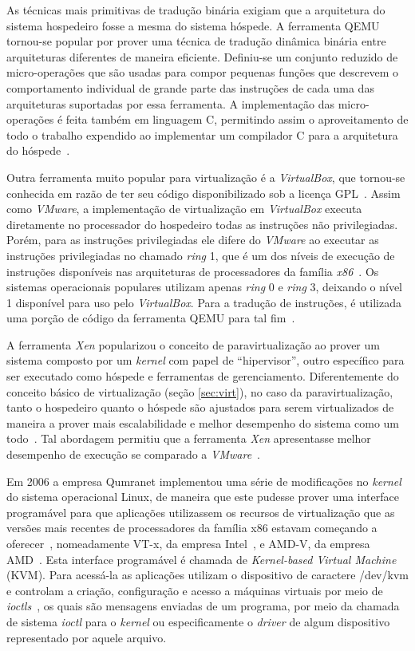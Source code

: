 As técnicas mais primitivas de tradução binária exigiam que a arquitetura
do sistema hospedeiro fosse a mesma do sistema hóspede. A ferramenta
QEMU tornou-se popular por prover uma técnica de
tradução dinâmica binária entre arquiteturas diferentes de maneira
eficiente. Definiu-se um conjunto reduzido de micro-operações que
são usadas para compor pequenas funções que descrevem o comportamento
individual de grande parte das instruções de cada uma das arquiteturas
suportadas por essa ferramenta. A implementação das micro-operações é feita
também em linguagem C, permitindo assim o aproveitamento de todo o
trabalho expendido ao implementar um compilador C para a arquitetura do
hóspede~\cite{bellard2005qemu}.

Outra ferramenta muito popular para virtualização é a
\emph{VirtualBox}, que tornou-se conhecida
em razão de ter seu código disponibilizado sob a licença
GPL~\cite{watson2008virtualbox}. Assim como \emph{VMware}, a implementação de
virtualização em \emph{VirtualBox} executa diretamente no processador do
hospedeiro todas as instruções não privilegiadas. Porém, para as instruções
privilegiadas ele difere do \emph{VMware} ao executar as instruções
privilegiadas no chamado \emph{ring} 1, que é um dos níveis de execução de
instruções disponíveis nas arquiteturas de processadores da família
\emph{x86}~\cite{uhlig2005intel}. Os sistemas operacionais populares utilizam
apenas \emph{ring} 0 e \emph{ring} 3, deixando o nível 1 disponível para uso
pelo \emph{VirtualBox}. Para a tradução de instruções, é utilizada uma porção
de código da ferramenta QEMU para tal fim~\cite{virtualboxTech}.

A ferramenta \emph{Xen} popularizou o conceito de
paravirtualização ao prover um sistema composto por um \emph{kernel} com papel
de “hipervisor”, outro específico para ser executado como hóspede e ferramentas
de gerenciamento. Diferentemente do conceito básico de virtualização
(seção \ref{sec:virt}), no caso da paravirtualização, tanto o hospedeiro
quanto o hóspede são ajustados para serem virtualizados de maneira a prover
mais escalabilidade e melhor desempenho do sistema como um
todo~\cite{whitaker2002denali}. Tal abordagem permitiu que a ferramenta
\emph{Xen} apresentasse melhor desempenho de execução se comparado a
\emph{VMware}~\cite{barham2003xen}.

Em 2006 a empresa Qumranet implementou uma série de modificações no
\emph{kernel} do sistema operacional Linux, de maneira que este pudesse prover
uma interface programável para que aplicações utilizassem os recursos de
virtualização que as versões mais recentes de processadores da família
x86 estavam começando a oferecer~\cite{kerneltrap2007avi}, nomeadamente
VT-x, da empresa Intel~\cite{uhlig2005intel}, e AMD-V, da empresa
AMD~\cite{strongin2005trusted}.  Esta interface programável é chamada de
\emph{Kernel-based Virtual Machine} (KVM). Para acessá-la as aplicações
utilizam o dispositivo de caractere /dev/kvm e controlam a criação,
configuração e acesso a máquinas virtuais por meio de
\emph{ioctls}~\cite{kivity2007kvm}, os quais são mensagens enviadas de um programa,
por meio da chamada de sistema \emph{ioctl} para o \emph{kernel} ou especificamente o
\emph{driver} de algum dispositivo representado por aquele arquivo.

